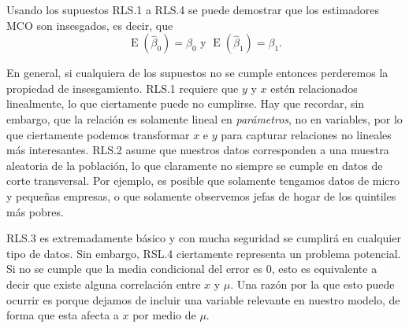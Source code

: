 \documentclass[12pt]{report}\usepackage[]{graphicx}\usepackage[]{color}
\newcommand{\E}{\operatorname{E}}
\begin{document}

\hrulefill

Usando los supuestos RLS.1 a RLS.4 se puede demostrar que los estimadores MCO son insesgados, es decir, que
\begin{equation}
\E(\hat\beta_0) = \beta_0 \text{ y } \E(\hat\beta_1) = \beta_1.
\end{equation}

En general, si cualquiera de los supuestos no se cumple entonces perderemos la propiedad de insesgamiento. RLS.1 requiere que $y$ y $x$ estén relacionados linealmente, lo que ciertamente puede no cumplirse. Hay que recordar, sin embargo, que la relación es solamente lineal en \emph{parámetros}, no en variables, por lo que ciertamente podemos transformar $x$ e $y$ para capturar relaciones no lineales más interesantes.
RLS.2 asume que nuestros datos corresponden a una muestra aleatoria de la población, lo que claramente no siempre se cumple en datos de corte transversal. Por ejemplo, es posible que solamente tengamos datos de micro y pequeñas empresas, o que solamente observemos jefas de hogar de los quintiles más pobres.

RLS.3 es extremadamente básico y con mucha seguridad se cumplirá en cualquier tipo de datos. Sin embargo, RSL.4 ciertamente representa un problema potencial. Si no se cumple que la media condicional del error es 0, esto es equivalente a decir que existe alguna correlación entre $x$ y $\mu$.
Una razón por la que esto puede ocurrir es porque dejamos de incluir una variable relevante en nuestro modelo, de forma que esta afecta a $x$ por medio de $\mu$.
\end{document}

